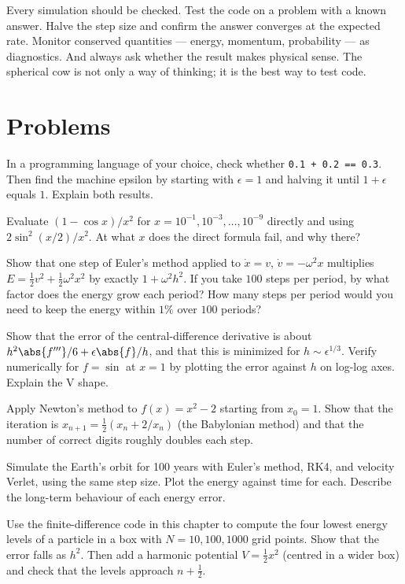 Every simulation should be checked. Test the code on a problem with a known answer. Halve the step size and confirm the answer converges at the expected rate. Monitor conserved quantities --- energy, momentum, probability --- as diagnostics. And always ask whether the result makes physical sense. The spherical cow is not only a way of thinking; it is the best way to test code.

\section{Problems}

\begin{problems}
 In a programming language of your choice, check whether \texttt{0.1 + 0.2 == 0.3}. Then find the machine epsilon by starting with $\epsilon = 1$ and halving it until $1 + \epsilon$ equals $1$. Explain both results.

 Evaluate $(1-\cos x)/x^2$ for $x = 10^{-1}, 10^{-3},\dots,10^{-9}$ directly and using $2\sin^2(x/2)/x^2$. At what $x$ does the direct formula fail, and why there?

\core \label{prob:euler-energy} Show that one step of Euler's method applied to $\dot x = v$, $\dot v = -\omega^2x$ multiplies $E = \tfrac12v^2 + \tfrac12\omega^2x^2$ by exactly $1+\omega^2h^2$. If you take $100$ steps per period, by what factor does the energy grow each period? How many steps per period would you need to keep the energy within $1\%$ over $100$ periods?

\core Show that the error of the central-difference derivative is about $h^2\abs{f'''}/6 + \epsilon\abs{f}/h$, and that this is minimized for $h\sim\epsilon^{1/3}$. Verify numerically for $f = \sin$ at $x=1$ by plotting the error against $h$ on log-log axes. Explain the V shape.

 Apply Newton's method to $f(x) = x^2-2$ starting from $x_0 = 1$. Show that the iteration is $x_{n+1} = \tfrac12(x_n + 2/x_n)$ (the Babylonian method) and that the number of correct digits roughly doubles each step.

\core Simulate the Earth's orbit for 100 years with Euler's method, RK4, and velocity Verlet, using the same step size. Plot the energy against time for each. Describe the long-term behaviour of each energy error.

 Use the finite-difference code in this chapter to compute the four lowest energy levels of a particle in a box with $N = 10, 100, 1000$ grid points. Show that the error falls as $h^2$. Then add a harmonic potential $V = \tfrac12x^2$ (centred in a wider box) and check that the levels approach $n+\tfrac12$.


\end{problems}
